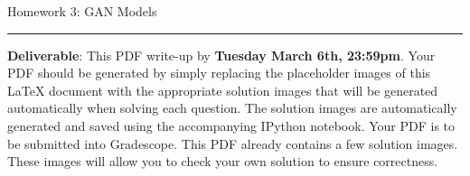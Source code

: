 \documentclass{article}
\newcommand{\ruleskip}{\bigskip\hrule\bigskip}
\begin{document}
\pagestyle{myheadings} 

{\huge
\noindent Homework 3: GAN Models}
\ruleskip

{\bf Deliverable}: This PDF write-up by {\bf Tuesday March 6th, 23:59pm}.  Your PDF should be generated by simply replacing the placeholder images of this LaTeX document with the appropriate solution images that will be generated automatically when solving each question. The solution images are automatically generated and saved using the accompanying IPython notebook. Your PDF is to be submitted into Gradescope. This PDF already contains a few solution images.  These images will allow you to check your own solution to ensure correctness.


\vspace{.2in}

\end{document}
